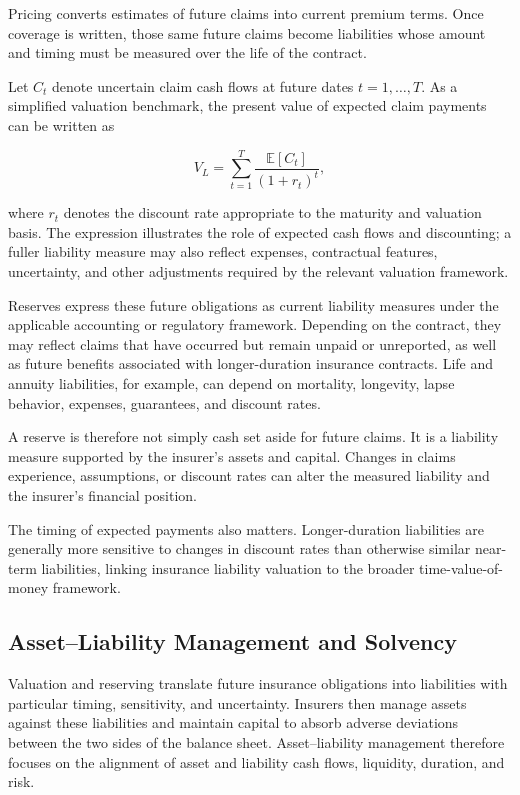 Pricing converts estimates of future claims into current premium terms. Once coverage is written, those same future claims become liabilities whose amount and timing must be measured over the life of the contract.

Let $C_t$ denote uncertain claim cash flows at future dates $t=1,\ldots,T$. As a simplified valuation benchmark, the present value of expected claim payments can be written as

\begin{equation}
V_L=\sum_{t=1}^{T}
\frac{\mathbb{E}[C_t]}{(1+r_t)^t},
\label{eq:ch15-insurance-liability-pv}
\end{equation}

where $r_t$ denotes the discount rate appropriate to the maturity and valuation basis. The expression illustrates the role of expected cash flows and discounting; a fuller liability measure may also reflect expenses, contractual features, uncertainty, and other adjustments required by the relevant valuation framework.

Reserves express these future obligations as current liability measures under the applicable accounting or regulatory framework. Depending on the contract, they may reflect claims that have occurred but remain unpaid or unreported, as well as future benefits associated with longer-duration insurance contracts. Life and annuity liabilities, for example, can depend on mortality, longevity, lapse behavior, expenses, guarantees, and discount rates.

A reserve is therefore not simply cash set aside for future claims. It is a liability measure supported by the insurer's assets and capital. Changes in claims experience, assumptions, or discount rates can alter the measured liability and the insurer's financial position.

The timing of expected payments also matters. Longer-duration liabilities are generally more sensitive to changes in discount rates than otherwise similar near-term liabilities, linking insurance liability valuation to the broader time-value-of-money framework.



\subsection{Asset--Liability Management and Solvency}

Valuation and reserving translate future insurance obligations into liabilities with particular timing, sensitivity, and uncertainty. Insurers then manage assets against these liabilities and maintain capital to absorb adverse deviations between the two sides of the balance sheet. Asset--liability management therefore focuses on the alignment of asset and liability cash flows, liquidity, duration, and risk.

